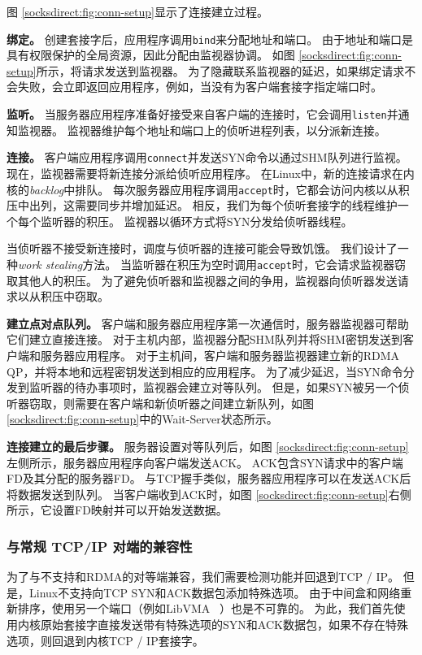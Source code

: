图 \ref {socksdirect:fig:conn-setup}显示了连接建立过程。

\textbf{绑定。}
创建套接字后，应用程序调用\texttt {bind}来分配地址和端口。
由于地址和端口是具有权限保护的全局资源，因此分配由监视器协调。
如图 \ref {socksdirect:fig:conn-setup}所示，\libipc {}将请求发送到监视器。
为了隐藏联系监视器的延迟，如果绑定请求不会失败，\libipc {}会立即返回应用程序，例如，当没有为客户端套接字指定端口时。

\textbf{监听。}
当服务器应用程序准备好接受来自客户端的连接时，它会调用\texttt {listen}并通知监视器。
监视器维护每个地址和端口上的侦听进程列表，以分派新连接。


\textbf{连接。}
客户端应用程序调用\texttt {connect}并发送SYN命令以通过SHM队列进行监视。
现在，监视器需要将新连接分派给侦听应用程序。
在Linux中，新的连接请求在内核的\emph {backlog}中排队。
每次服务器应用程序调用\texttt {accept}时，它都会访问内核以从积压中出列，这需要同步并增加延迟。
相反，我们为每个侦听套接字的线程维护一个每个监听器的积压。
监视器以循环方式将SYN分发给侦听器线程。

当侦听器不接受新连接时，调度与侦听器的连接可能会导致饥饿。
我们设计了一种\emph {work stealing}方法。
当监听器在积压为空时调用\texttt {accept}时，它会请求监视器窃取其他人的积压。
为了避免侦听器和监视器之间的争用，监视器向侦听器发送请求以从积压中窃取。

\textbf {建立点对点队列。}
客户端和服务器应用程序第一次通信时，服务器监视器可帮助它们建立直接连接。
对于主机内部，监视器分配SHM队列并将SHM密钥发送到客户端和服务器应用程序。
对于主机间，客户端和服务器监视器建立新的RDMA QP，并将本地和远程密钥发送到相应的应用程序。
为了减少延迟，当SYN命令分发到监听器的待办事项时，监视器会建立对等队列。
但是，如果SYN被另一个侦听器窃取，则需要在客户端和新侦听器之间建立新队列，如图 \ref {socksdirect:fig:conn-setup}中的Wait-Server状态所示。

\textbf {连接建立的最后步骤。}
服务器设置对等队列后，如图 \ref {socksdirect:fig:conn-setup}左侧所示，服务器应用程序向客户端发送ACK。 ACK包含SYN请求中的客户端FD及其分配的服务器FD。
与TCP握手类似，服务器应用程序可以在发送ACK后将数据发送到队列。
当客户端收到ACK时，如图 \ref {socksdirect:fig:conn-setup}右侧所示，它设置FD映射并可以开始发送数据。


\subsubsection{与常规 TCP/IP 对端的兼容性}


为了与不支持\sys {}和RDMA的对等端兼容，我们需要检测\sys {}功能并回退到TCP / IP。
但是，Linux不支持向TCP SYN和ACK数据包添加特殊选项。
由于中间盒和网络重新排序，使用另一个端口（例如LibVMA~ \cite {libvma}）也是不可靠的。
为此，我们首先使用内核原始套接字直接发送带有特殊选项的SYN和ACK数据包，如果不存在特殊选项，则回退到内核TCP / IP套接字。

